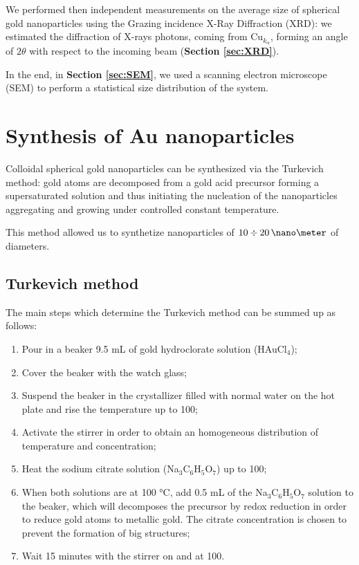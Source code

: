 \documentclass[twocolumn]{article}
\begin{document}
\begin{multicols}{2}
We performed then independent measurements on the average size of spherical gold nanoparticles using the Grazing incidence X-Ray Diffraction (XRD): we estimated the diffraction of X-rays photons, coming from \(\text{Cu}_{k_\alpha}\), forming an angle of \(2\theta\) with respect to the incoming beam (\textbf{Section \ref{sec:XRD}}).

In the end, in \textbf{Section \ref{sec:SEM}}, we used a scanning electron microscope (SEM) to perform a statistical size distribution of the system.


\section{Synthesis of Au nanoparticles}
\label{sec:synthesis}
\noindent
Colloidal spherical gold nanoparticles can be synthesized via the Turkevich method: gold atoms are decomposed from a gold acid precursor forming a supersaturated solution and thus initiating the nucleation of the nanoparticles aggregating and growing under controlled constant temperature.

This method allowed us to synthetize nanoparticles of $10 \div 20 \,\nano\meter$ of diameters.

\subsection{Turkevich method}
The main steps which determine the Turkevich method can be summed up as follows:

\begin{enumerate}
    \item Pour in a beaker 9.5 mL of gold hydroclorate solution (HAuCl$_4$);
    \item Cover the beaker with the watch glass;
    \item Suspend the beaker in the crystallizer filled with normal water on the hot plate and rise the temperature up to 100\degreecelsius;
    \item Activate the stirrer in order to obtain an homogeneous distribution of temperature and concentration;
    \item Heat the sodium citrate solution (Na$_3$C$_6$H$_5$O$_7$) up to 100\degreecelsius;
    \item When both solutions are at 100 °C, add 0.5 mL of the Na$_3$C$_6$H$_5$O$_7$ solution to the beaker, which will decomposes the precursor by redox reduction in order to reduce gold atoms to metallic gold. The citrate concentration is chosen to prevent the formation of big structures;
    \item Wait 15 minutes with the stirrer on and at 100\degreecelsius.
\end{enumerate}


\end{multicols}
\end{document}
